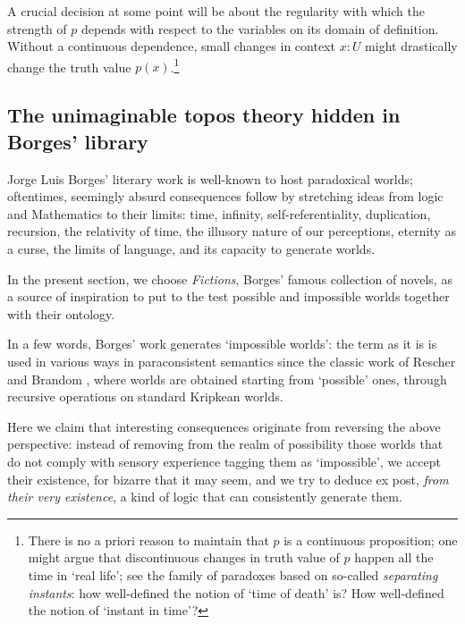 A crucial decision at some point will be about the regularity with which the strength of $p$ depends with respect to the variables on its domain of definition. Without a continuous dependence, small changes in context $x : U$ might drastically change the truth value $p(x)$.\footnote{There is no a priori reason to maintain that $p$ is a continuous proposition; one might argue that discontinuous changes in truth value of $p$ happen all the time in `real life'; see the family of paradoxes based on so-called \emph{separating instants}: how well-defined the notion of `time of death' is? How well-defined the notion of `instant in time'?}
\subsection{The unimaginable topos theory hidden in Borges' library}
Jorge Luis Borges' literary work is well-known to host paradoxical worlds; oftentimes, seemingly absurd consequences follow by stretching ideas from logic and Mathematics to their limits: time, infinity, self-referentiality, duplication, recursion, the relativity of time, the illusory nature of our perceptions, eternity as a curse, the limits of language, and its capacity to generate worlds.

In the present section, we choose \emph{Fictions}, Borges' famous collection of novels, as a source of inspiration to put to the test possible and impossible worlds together with their ontology.

In a few words, Borges' work generates `impossible worlds': the term as it is is used in various ways in paraconsistent semantics since the classic work of Rescher and Brandom \cite{10.2307/20127724}, where worlds are obtained starting from `possible' ones, through recursive operations on standard Kripkean worlds.

Here we claim that interesting consequences originate from reversing the above perspective: instead of removing from the realm of possibility those worlds that do not comply with sensory experience tagging them as `impossible', we accept their existence, for bizarre that it may seem, and we try to deduce ex post, \emph{from their very existence}, a kind of logic that can consistently generate them.

